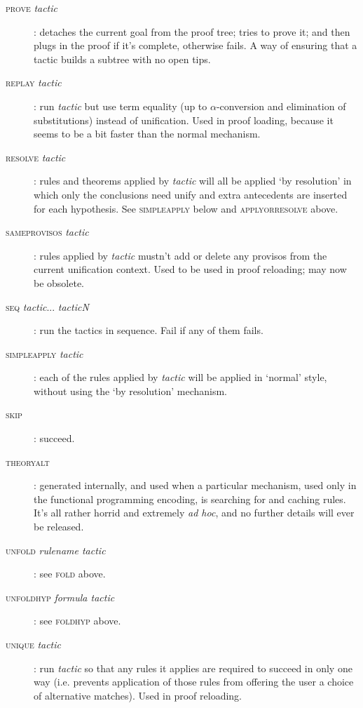 \begin{description}
\item [\textsc{prove} \textit{tactic}]: detaches the current goal from the proof tree; tries to prove it; and then plugs in the proof if it's complete, otherwise fails. A way of ensuring that a tactic builds a subtree with no open tips.

\item [\textsc{replay} \textit{tactic}]: run \textit{tactic} but use term equality (up to \ensuremath{\alpha}-conversion and elimination of substitutions) instead of unification. Used in proof loading, because it seems to be a bit faster than the normal mechanism.

\item [\textsc{resolve} \textit{tactic}]: rules and theorems applied by \textit{tactic} will all be applied `by resolution' in which only the conclusions need unify and extra antecedents are inserted for each hypothesis. See \textsc{simpleapply} below and \textsc{applyorresolve} above.


\item [\textsc{sameprovisos} \textit{tactic}]: rules applied by \textit{tactic} mustn't add or delete any provisos from the current unification context. Used to be used in proof reloading; may now be obsolete.


\item [\textsc{seq} \textit{tactic}... \textit{tacticN}]: run the tactics in sequence. Fail if any of them fails.


\item [\textsc{simpleapply} \textit{tactic}]: each of the rules applied by \textit{tactic} will be applied in `normal' style, without using the `by resolution' mechanism.


\item [\textsc{skip}]: succeed.


\item [\textsc{theoryalt}]: generated internally, and used when a particular mechanism, used only in the functional programming encoding, is searching for and caching rules. It's all rather horrid and extremely \textit{ad hoc}, and no further details will ever be released.


\item [\textsc{unfold} \textit{rulename tactic}]: see \textsc{fold} above.
\item [\textsc{unfoldhyp} \textit{formula tactic}]: see \textsc{foldhyp} above.


\item [\textsc{unique} \textit{tactic}]: run \textit{tactic} so that any rules it applies are required to succeed in only one way (i.e. prevents application of those rules from offering the user a choice of alternative matches). Used in proof reloading.



\end{description}
